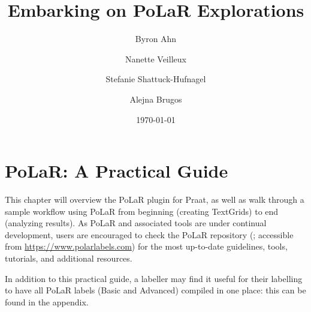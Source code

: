 \documentclass[11pt, twoside]{memoir}
\def\THIStitle{Embarking on PoLaR Explorations}
\def\THISsubtitle{A Framework for Intonational Annotation and Analysis}
\begin{document}
\frontmatter
{}

\title{\THIStitle}
\author{Byron Ahn \and Nanette Veilleux \and Stefanie Shattuck-Hufnagel \and Alejna Brugos}
\date{\today}


\tableofcontents
\newpage
\listoffigures
\listoftables
\newpage

\mainmatter
\chapter{PoLaR: A Practical Guide}\label{ch:practical}

This chapter will overview the PoLaR plugin for Praat, as well as walk through a sample workflow using PoLaR from beginning (creating TextGrids) to end (analyzing results). As PoLaR and associated tools are under continual development, users are encouraged to check the PoLaR repository (\citealt{ahn-21}; accessible from \href{https://www.polarlabels.com}{https://www.polarlabels.com}) for the most up-to-date guidelines, tools, tutorials, and additional resources.

In addition to this practical guide, a labeller may find it useful for their labelling to have all PoLaR labels (Basic and Advanced) compiled in one place: this can be found in the appendix.
\end{document}
